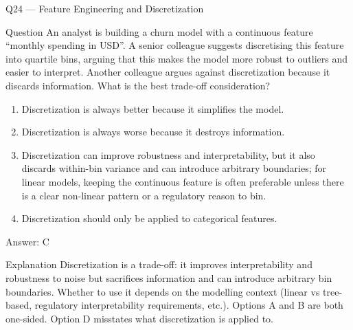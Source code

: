 \documentclass[aspectratio=169,8pt]{beamer}
\begin{document}
	\begin{frame}{Q24 --- Feature Engineering and Discretization}
		\begin{block}{Question}
			An analyst is building a churn model with a continuous feature ``monthly spending in USD''. A senior colleague suggests discretising this feature into quartile bins, arguing that this makes the model more robust to outliers and easier to interpret. Another colleague argues against discretization because it discards information. What is the best trade-off consideration?
		\end{block}
		\begin{enumerate}
			\item Discretization is always better because it simplifies the model.
			\item Discretization is always worse because it destroys information.
			\item Discretization can improve robustness and interpretability, but it also discards within-bin variance and can introduce arbitrary boundaries; for linear models, keeping the continuous feature is often preferable unless there is a clear non-linear pattern or a regulatory reason to bin.
			\item Discretization should only be applied to categorical features.
		\end{enumerate}
		\begin{exampleblock}{Answer: C}\end{exampleblock}
		\begin{block}{Explanation}
			Discretization is a trade-off: it improves interpretability and robustness to noise but sacrifices information and can introduce arbitrary bin boundaries. Whether to use it depends on the modelling context (linear vs tree-based, regulatory interpretability requirements, etc.). Options A and B are both one-sided. Option D misstates what discretization is applied to.
		\end{block}
	\end{frame}
	
\end{document}
